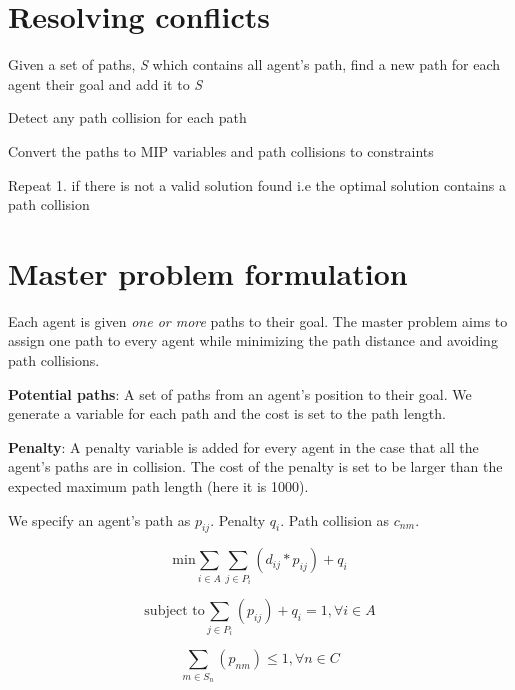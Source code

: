 \documentclass[a4paper,11pt]{article}
\begin{document}
\section{Resolving conflicts}
\begin{compactenum}
	\item Given a set of paths, \textit{S} which contains all agent's path, find a new path for each agent their goal and add it to \textit{S}
	\item Detect any path collision for each path
	\item Convert the paths to MIP variables and path collisions to constraints
	\item Repeat 1. if there is not a valid solution found i.e the optimal solution contains a path collision
\end{compactenum}

\section{Master problem formulation} \label{sec:mip}
Each agent is given \textit{one or more} paths to their goal. The master problem aims to assign one path to every agent while minimizing the path distance and avoiding path collisions. 

\begin{compactitem}
	\item \textbf{Potential paths}: A set of paths from an agent's position to their goal. We generate a variable for each path and the cost is set to the path length.
	\item \textbf{Penalty}: A penalty variable is added for every agent in the case that all the agent's paths are in collision. The cost of the penalty is set to be larger than the expected maximum path length (here it is 1000).
\end{compactitem}

We specify an agent's path as $p_{ij}$. Penalty $q_i$. Path collision as $c_{nm}$.

\begin{equation}
\text{min} \sum_{i \in A} \sum_{j \in P_i} (d_{ij} * p_{ij}) + q_i
\end{equation}

\begin{equation} %
\text{subject to} \sum_{j \in P_i} (p_{ij}) + q_i = 1, \forall i \in A
\end{equation}

\begin{equation} %
\sum_{m \in S_n} (p_{nm}) \le 1, \forall n \in C
\end{equation}
\end{document}
